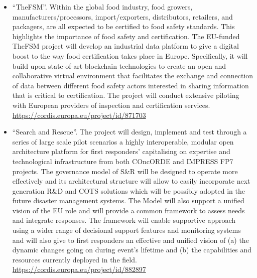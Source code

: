 \documentclass[a4paper,oneside,10pt]{article}
\begin{document}
\begin{itemize}
\begin{sloppypar}
\end{sloppypar}

\item \begin{sloppypar}
``TheFSM''. Within the global food industry, food growers, manufacturers/processors, import/exporters, distributors, retailers, and packagers, are all expected to be certified to food safety standards. This highlights the importance of food safety and certification. The EU-funded TheFSM project will develop an industrial data platform to give a digital boost to the way food certification takes place in Europe. Specifically, it will build upon state-of-art blockchain technologies to create an open and collaborative virtual environment that facilitates the exchange and connection of data between different food safety actors interested in sharing information that is critical to certification. The project will conduct extensive piloting with European providers of inspection and certification services. \url{https://cordis.europa.eu/project/id/871703}

\end{sloppypar}

\item \begin{sloppypar}
``Search and Rescue''. The project will design, implement and test through a series of large scale pilot scenarios a highly interoperable, modular open architecture platform for first responders’ capitalising on expertise and technological infrastructure from both COncORDE and IMPRESS FP7 projects. The governance model of S\&R will be designed to operate more effectively and its architectural structure will allow to easily incorporate next generation R\&D and COTS solutions which will be possibly adopted in the future disaster management systems. The Model will also support a unified vision of the EU role and will provide a common framework to assess needs and integrate responses. The framework will enable supportive approach using a wider range of decisional support features and monitoring systems and will also give to first responders an effective and unified vision of (a) the dynamic changes going on during event's lifetime and (b) the capabilities and resources currently deployed in the field. \url{https://cordis.europa.eu/project/id/882897}

\end{sloppypar}


\end{itemize}
\end{document}

